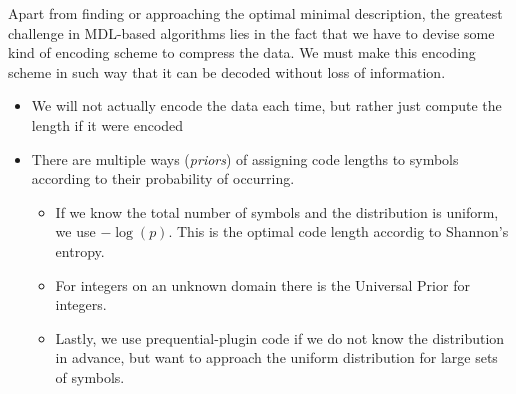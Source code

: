 \documentclass[a4paper,notoc,oneside]{tufte-book}
\begin{document}
Apart from finding or approaching the optimal minimal description, the greatest challenge in MDL-based algorithms lies in the fact that we have to devise some kind of encoding scheme to compress the data. We must make this encoding scheme in such way that it can be decoded without loss of information.
\begin{itemize}
\item We will not actually encode the data each time, but rather just compute the length if it were encoded
\item There are multiple ways (\emph{priors}) of assigning code lengths to symbols according to their probability of occurring. \begin{itemize}
\item If we know the total number of symbols and the distribution is uniform, we use $-\log(p)$. This is the optimal code length accordig to Shannon's entropy. 
\item For integers on an unknown domain there is the Universal Prior for integers. 
\item Lastly, we use prequential-plugin code if we do not know the distribution in advance, but want to approach the uniform distribution for large sets of symbols.
\end{itemize}
\end{itemize}
\end{document}

